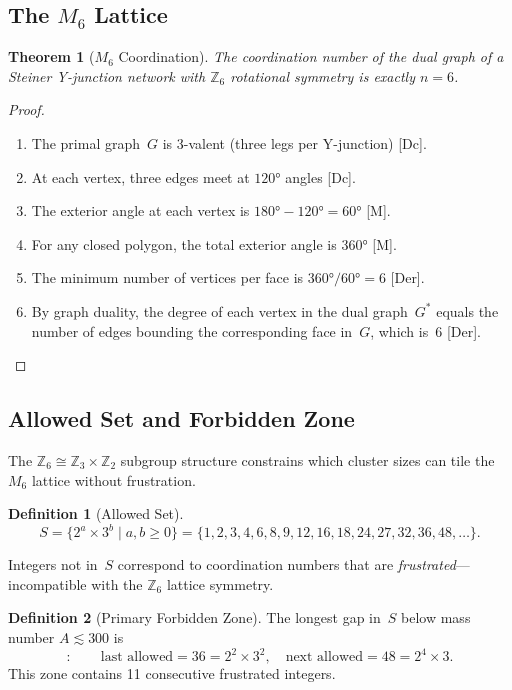 \documentclass[12pt,a4paper]{article}
\newtheorem{theorem}{Theorem}
\theoremstyle{definition}
\newtheorem{definition}{Definition}
\theoremstyle{remark}
\newcommand{\tagDer}{\textsf{[Der]}}
\newcommand{\tagDc}{\textsf{[Dc]}}
\newcommand{\tagM}{\textsf{[M]}}
\newcommand{\Zn}[1]{\mathbb{Z}_{#1}}
\begin{document}
\subsection{The $M_6$ Lattice}

\begin{theorem}[$M_6$ Coordination]
\label{thm:M6}
The coordination number of the dual graph of a Steiner Y-junction
network with $\Zn{6}$ rotational symmetry is exactly $n = 6$.
\end{theorem}

\begin{proof}
\begin{enumerate}[nosep]
\item The primal graph~$G$ is 3-valent (three legs per Y-junction)
  \tagDc.
\item At each vertex, three edges meet at $120°$ angles \tagDc.
\item The exterior angle at each vertex is
  $180° - 120° = 60°$ \tagM.
\item For any closed polygon, the total exterior angle is $360°$
  \tagM.
\item The minimum number of vertices per face is
  $360°/60° = 6$ \tagDer.
\item By graph duality, the degree of each vertex in the dual
  graph~$G^*$ equals the number of edges bounding the corresponding
  face in~$G$, which is~6 \tagDer.
  \qedhere
\end{enumerate}
\end{proof}

\subsection{Allowed Set and Forbidden Zone}

The $\Zn{6} \cong \Zn{3} \times \Zn{2}$ subgroup structure
constrains which cluster sizes can tile the $M_6$ lattice without
frustration.

\begin{definition}[Allowed Set]
\[
  S = \{2^a \times 3^b \mid a, b \geq 0\}
    = \{1, 2, 3, 4, 6, 8, 9, 12, 16, 18, 24, 27, 32, 36, 48, \ldots\}.
\]
\end{definition}

Integers not in~$S$ correspond to coordination numbers that are
\emph{frustrated}---incompatible with the $\Zn{6}$ lattice
symmetry.

\begin{definition}[Primary Forbidden Zone]
The longest gap in~$S$ below mass number $A \lesssim 300$ is
\begin{equation}
  [37, 47]:
  \qquad
  \text{last allowed} = 36 = 2^2 \times 3^2,
  \quad
  \text{next allowed} = 48 = 2^4 \times 3.
  \label{eq:forbidden}
\end{equation}
This zone contains 11 consecutive frustrated integers.
\end{definition}
\end{document}

